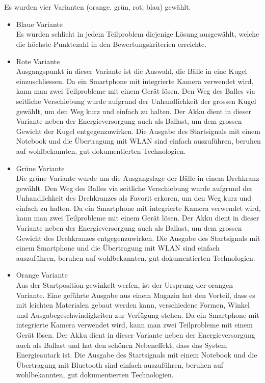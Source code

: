 \\
\\
Es wurden vier Varianten (orange, grün, rot, blau) gewählt. 
\begin{itemize}
	\item Blaue Variante\\
	Es wurden schlicht in jedem Teilproblem diejenige Lösung ausgewählt, welche die höchste Punktezahl in den Bewertungskriterien erreichte.
	
	\item Rote Variante\\
	Ausgangspunkt in dieser Variante ist die Auswahl, die Bälle in eine Kugel einzuschliessen. Da ein Smartphone mit integrierte Kamera verwendet wird, kann man zwei Teilprobleme mit einem Gerät lösen. Den Weg des Balles via seitliche Verschiebung wurde aufgrund der Unhandlichkeit der grossen Kugel gewählt, um den Weg kurz und einfach zu halten. Der Akku dient in dieser Variante neben der Energieversorgung auch als Ballast, um dem grossen Gewicht der Kugel entgegenzuwirken. Die Ausgabe des Startsignals mit einem Notebook und die Übertragung mit WLAN sind einfach auszuführen, beruhen auf wohlbekannten, gut dokumentierten Technologien.
	
	\item Grüne Variante\\
	Die grüne Variante wurde um die Ausgangslage der Bälle in einem Drehkranz gewählt. Den Weg des Balles via seitliche Verschiebung wurde aufgrund der Unhandlichkeit des Drehkranzes als Favorit erkoren, um den Weg kurz und einfach zu halten. Da ein Smartphone mit integrierte Kamera verwendet wird, kann man zwei Teilprobleme mit einem Gerät lösen. Der Akku dient in dieser Variante neben der Energieversorgung auch als Ballast, um dem grossen Gewicht des Drehkranzes entgegenzuwirken. Die Ausgabe des Startsignals mit einem Smartphone und die Übertragung mit WLAN sind einfach auszuführen, beruhen auf wohlbekannten, gut dokumentierten Technologien.
	
	\item Orange Variante\\
	Aus der Startposition gewinkelt werfen, ist der Ursprung der orangen Variante. Eine geführte Ausgabe aus einem Magazin hat den Vorteil, dass es mit leichten Materialen gebaut werden kann, verschiedene Formen, Winkel und Ausgabegeschwindigkeiten zur Verfügung stehen. Da ein Smartphone mit integrierte Kamera verwendet wird, kann man zwei Teilprobleme mit einem Gerät lösen. Der Akku dient in dieser Variante neben der Energieversorgung auch als Ballast und hat den schönen Nebeneffekt, dass das System Energieautark ist. Die Ausgabe des Startsignals mit einem Notebook und die Übertragung mit Bluetooth sind einfach auszuführen, beruhen auf wohlbekannten, gut dokumentierten Technologien.	
\end{itemize}

